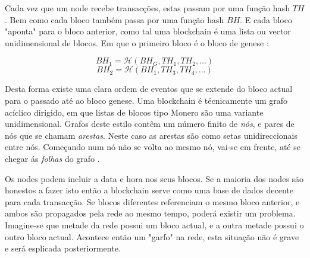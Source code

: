 Cada vez que um node recebe transacções, estas passam por uma função hash $\mathit{TH}$.
Bem como cada bloco também passa por uma função hash $\mathit{BH}$. E cada bloco "aponta" para o bloco anterior, como tal uma blockchain é uma lista ou vector unidimensional de blocos. Em que o primeiro bloco é o bloco de genese :  


\vspace{.175cm}
\[\mathit{BH}_1 = \mathcal{H}(\mathit{BH}_G, \mathit{TH}_1, \mathit{TH}_2,...)\]
\[\mathit{BH}_2 = \mathcal{H}(\mathit{BH}_1, \mathit{TH}_3, \mathit{TH}_4,...)\]

Desta forma existe uma clara ordem de eventos que se extende do bloco actual para o passado até ao bloco genese. Uma blockchain é técnicamente um grafo acíclico dirigido, em que listas de blocos tipo Monero são uma variante unidimensional. Grafos deste estilo contêm um número finito de {\em nós}, e pares de nós que se chamam {\em arestas}. Neste caso as arestas são como setas unidireccionais entre nós. Começando num nó não se volta ao mesmo nó, vai-se em frente, até se chegar ás {\em folhas} do grafo \cite{DAG-wikipedia}.  

Os nodes podem incluir a data e hora nos seus blocos. Se a maioria dos nodes são honestos a fazer isto então a blockchain serve como uma base de dados decente para cada transacção.
Se blocos diferentes referenciam o mesmo bloco anterior, e ambos são propagados pela rede ao mesmo tempo, poderá existir um problema. Imagine-se que metade da rede possui um bloco actual, e a outra metade possui o outro bloco actual. Acontece então um "garfo" na rede, esta situação não é grave e será esplicada posteriormente.
